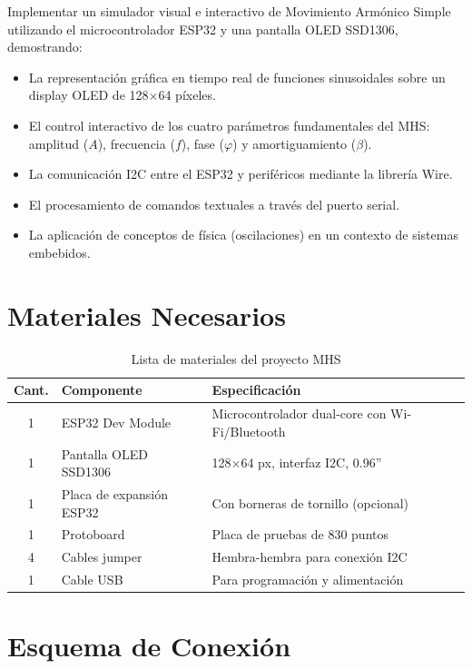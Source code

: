 \documentclass[12pt,a4paper]{article}
\begin{document}
Implementar un simulador visual e interactivo de Movimiento Armónico Simple utilizando el microcontrolador ESP32 y una pantalla OLED SSD1306, demostrando:
\begin{itemize}
    \item La representación gráfica en tiempo real de funciones sinusoidales sobre un display OLED de 128$\times$64 píxeles.
    \item El control interactivo de los cuatro parámetros fundamentales del MHS: amplitud ($A$), frecuencia ($f$), fase ($\varphi$) y amortiguamiento ($\beta$).
    \item La comunicación I2C entre el ESP32 y periféricos mediante la librería Wire.
    \item El procesamiento de comandos textuales a través del puerto serial.
    \item La aplicación de conceptos de física (oscilaciones) en un contexto de sistemas embebidos.
\end{itemize}

\section{Materiales Necesarios}

\begin{table}[h!]
\centering
\begin{tabular}{cll}
\toprule
\textbf{Cant.} & \textbf{Componente} & \textbf{Especificación} \\
\midrule
1 & ESP32 Dev Module & Microcontrolador dual-core con Wi-Fi/Bluetooth \\
1 & Pantalla OLED SSD1306 & 128$\times$64 px, interfaz I2C, 0.96'' \\
1 & Placa de expansión ESP32 & Con borneras de tornillo (opcional) \\
1 & Protoboard & Placa de pruebas de 830 puntos \\
4 & Cables jumper & Hembra-hembra para conexión I2C \\
1 & Cable USB & Para programación y alimentación \\
\bottomrule
\end{tabular}
\caption{Lista de materiales del proyecto MHS}
\end{table}

\section{Esquema de Conexión}
\end{document}
